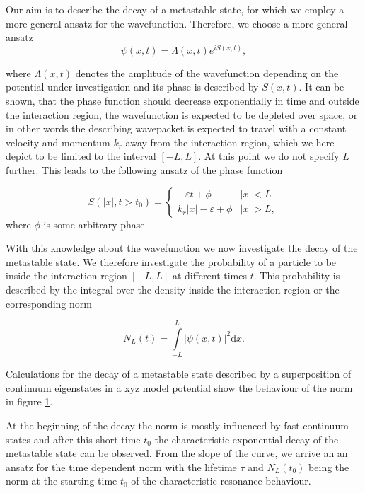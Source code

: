 Our aim is to describe the decay of a metastable state, for which we employ
a more general ansatz for the wavefunction.
Therefore, we choose a more general ansatz
\begin{equation}
  \psi(x,t) = \Lambda(x,t) e^{iS(x,t)}   ,
\end{equation}

where $\Lambda(x,t)$ denotes the amplitude of the wavefunction
depending on the potential under investigation and
its phase is described by $S(x,t)$. It can be shown, that the phase function
should decrease exponentially in time and outside the interaction region,
the wavefunction is expected to be depleted over space, or in other words the
describing wavepacket is expected to travel with a constant velocity and 
momentum $k_r$ away
from the interaction region, which we here depict to be limited to the
interval $[-L,L]$. At this point we do not specify $L$ further.
This leads to the following ansatz of the
phase function

\begin{equation}
  S(|x|,t>t_0) = \begin{cases}
                   -\varepsilon t + \phi       & |x| < L \\
                   k_r |x| -\varepsilon + \phi & |x| > L   ,
                 \end{cases}
\end{equation}
where $\phi$ is some arbitrary phase.


With this knowledge about the wavefunction we now investigate the decay
of the metastable state. We therefore investigate the probability of a particle
to be inside the interaction region $[-L,L]$ at different times $t$. This
probability is described by the integral over the density inside the interaction
region or the corresponding norm

\begin{equation}
  N_L(t) = \int\limits_{-L}^L |\psi(x,t)|^2 \mathrm d x .
\end{equation}

Calculations for the decay of a metastable state described by a superposition
of continuum eigenstates in a xyz model potential
show the behaviour of the norm in figure \ref{figure:decay_norm}.

\begin{figure}[h]
  \centering
  \caption{}
  \label{figure:decay_norm}
\end{figure}

At the beginning of the decay the norm is mostly influenced by fast
continuum states and after this short time $t_0$ the characteristic
exponential decay of the metastable state can be observed. From the slope
of the curve, we arrive an an ansatz for the time dependent norm with
the lifetime $\tau$ and $N_L(t_0)$ being the norm at the starting time
$t_0$ of the characteristic resonance behaviour.

